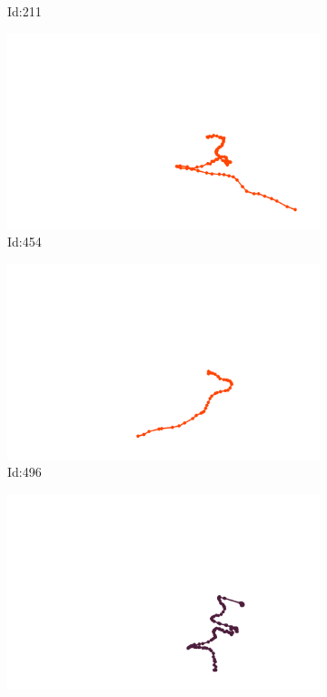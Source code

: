 \documentclass[12pt,twoside]{report}
\begin{document}
\begin{figure}
\begin{subfigure}[b]{0.20\textwidth}
\caption{Id:211}
\end{subfigure}
\begin{subfigure}[b]{0.20\textwidth}
\centering
\includegraphics[width=\textwidth]{../../trajectories/454.png}
\caption{Id:454}
\end{subfigure}
\begin{subfigure}[b]{0.20\textwidth}
\centering
\includegraphics[width=\textwidth]{../../trajectories/496.png}
\caption{Id:496}
\end{subfigure}
\begin{subfigure}[b]{0.20\textwidth}
\centering
\includegraphics[width=\textwidth]{../../trajectories/571.png}

\end{subfigure}
\end{figure}
\end{document}
